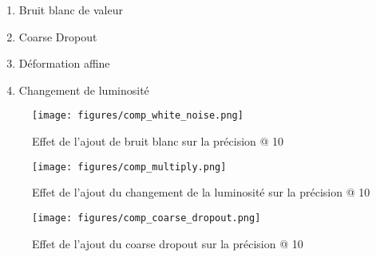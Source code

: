 \begin{enumerate}
        \label{enum:transformations}
    \item Bruit blanc de valeur
    \item Coarse Dropout
    \item D\'eformation affine
    \item Changement de luminosité
\end{enumerate}

\begin{figure}
    \centering
    \texttt{[image: figures/comp\_white\_noise.png]}
    \label{fig:inception_WN_10}
    \caption{Effet de l'ajout de bruit blanc sur la précision @ 10}
\end{figure}

\begin{figure}
    \centering
    \texttt{[image: figures/comp\_multiply.png]}
    \label{fig:inception_WN_10}
    \caption{Effet de l'ajout du changement de la luminosité sur la précision @ 10}
\end{figure}

\begin{figure}
    \centering
    \texttt{[image: figures/comp\_coarse\_dropout.png]}
    \label{fig:inception_WN_10}
    \caption{Effet de l'ajout du coarse dropout sur la précision @ 10}
\end{figure}
